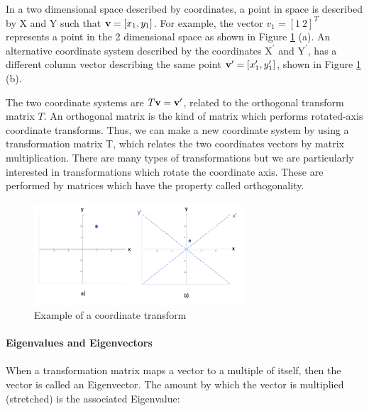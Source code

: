 \documentclass[11pt, oneside]{article}   	%
\begin{document}
In a two dimensional space described by coordinates, a point in space is described by X and Y such that ${\bf v} = [x_1, y_1]$. For example, the vector $v_1 = [1 ~2]^T$ represents a point in the 2 dimensional space as shown in Figure \ref{fig:CoordinateTransform} (a).
An alternative coordinate system described by the coordinates $\text{X}^\prime$ and $\text{Y}^\prime$, has a different column vector describing the same point ${\bf v^\prime} = [x_1^\prime, y_1^\prime]$, shown in Figure \ref{fig:CoordinateTransform} (b).

The two coordinate systems are $T{\bf v} = {\bf v}^\prime$, related to the orthogonal transform matrix $T$. An orthogonal matrix is the kind of matrix which performs rotated-axis coordinate transforms. Thus, we can make a new coordinate system by using a transformation matrix T, which relates the two coordinates vectors by matrix multiplication. There are many types of transformations but we are particularly interested in transformations which rotate the coordinate axis. These are performed by matrices which have the property called orthogonality.

\begin{figure}[!h]
	\centering
	\includegraphics[width=0.7\textwidth]{example-coordinate-transform}
	\caption{Example of a coordinate transform}
	\label{fig:CoordinateTransform}
\end{figure}



\paragraph{Eigenvalues and Eigenvectors}
\paragraph{}

When a transformation matrix maps a vector to a multiple of itself, then the vector is called an Eigenvector. The amount by which the vector is multiplied (stretched) is the associated Eigenvalue:
\end{document}
